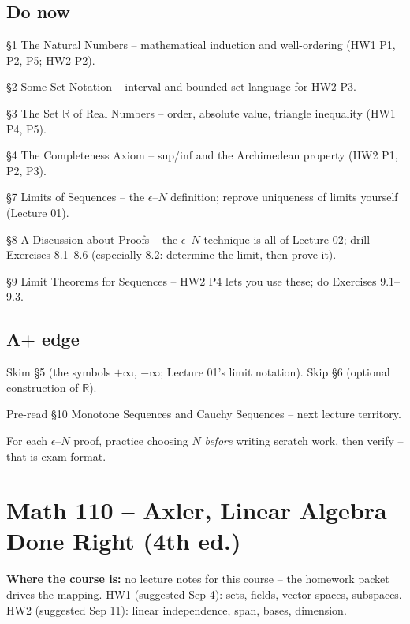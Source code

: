 \documentclass[11pt]{article}
\begin{document}
\subsection*{Do now}
\begin{todo}
  \item \S1 The Natural Numbers -- mathematical induction and well-ordering
    (HW1 P1, P2, P5; HW2 P2).
  \item \S2 Some Set Notation -- interval and bounded-set language for HW2 P3.
  \item \S3 The Set $\mathbb{R}$ of Real Numbers -- order, absolute value,
    triangle inequality (HW1 P4, P5).
  \item \S4 The Completeness Axiom -- sup/inf and the Archimedean property
    (HW2 P1, P2, P3).
  \item \S7 Limits of Sequences -- the $\epsilon$--$N$ definition; reprove
    uniqueness of limits yourself (Lecture 01).
  \item \S8 A Discussion about Proofs -- the $\epsilon$--$N$ technique is all of
    Lecture 02; drill Exercises 8.1--8.6 (especially 8.2: determine the limit,
    then prove it).
  \item \S9 Limit Theorems for Sequences -- HW2 P4 lets you use these; do
    Exercises 9.1--9.3.
\end{todo}

\subsection*{A+ edge}
\begin{todo}
  \item Skim \S5 (the symbols $+\infty$, $-\infty$; Lecture 01's limit
    notation). Skip \S6 (optional construction of $\mathbb{R}$).
  \item Pre-read \S10 Monotone Sequences and Cauchy Sequences -- next lecture
    territory.
  \item For each $\epsilon$--$N$ proof, practice choosing $N$ \emph{before}
    writing scratch work, then verify -- that is exam format.
\end{todo}

\section*{Math 110 -- Axler, Linear Algebra Done Right (4th ed.)}
\textbf{Where the course is:} no lecture notes for this course -- the homework
packet drives the mapping. HW1 (suggested Sep 4): sets, fields, vector spaces,
subspaces. HW2 (suggested Sep 11): linear independence, span, bases, dimension.
\end{document}
